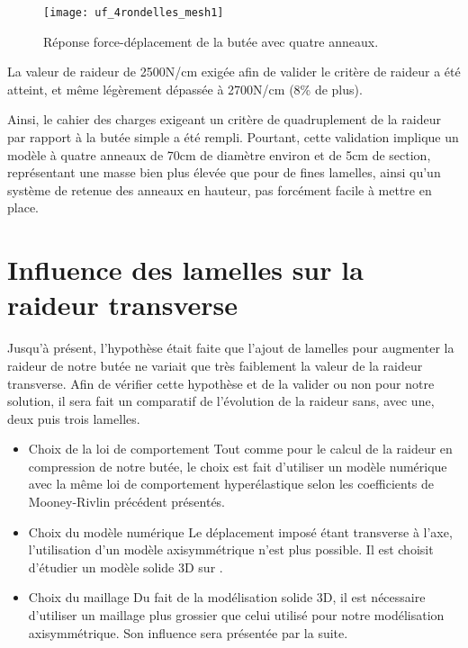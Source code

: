 ﻿\documentclass{article}
\newcommand{\abaqus}{\bsc{Abaqus}\xspace}
\newcommand{\cimg}{0.8}
\begin{document}
\begin{figure}[!h]
	\centering
	\texttt{[image: uf\_4rondelles\_mesh1]}
	\caption{Réponse force-déplacement de la butée avec quatre anneaux.}
	\label{fig36}
\end{figure}

La valeur de raideur de 2500N/cm exigée afin de valider le critère de raideur a été atteint, et même légèrement dépassée à 2700N/cm (8\% de plus).

Ainsi, le cahier des charges exigeant un critère de quadruplement de la raideur par rapport à la butée simple a été rempli. Pourtant, cette validation implique un modèle à quatre anneaux de 70cm de diamètre environ et de 5cm de section, représentant une masse bien plus élevée que pour de fines lamelles, ainsi qu'un système de retenue des anneaux en hauteur, pas forcément facile à mettre en place.

\section{Influence des lamelles sur la raideur transverse}
Jusqu'à présent, l'hypothèse était faite que l'ajout de lamelles pour augmenter la raideur de notre butée ne variait que très faiblement la valeur de la raideur transverse. Afin de vérifier cette hypothèse et de la valider ou non pour notre solution, il sera fait un comparatif de l'évolution de la raideur sans, avec une, deux puis trois lamelles. 

\begin{itemize}
\item Choix de la loi de comportement
Tout comme pour le calcul de la raideur en compression de notre butée, le choix est fait d'utiliser un modèle numérique avec la même loi de comportement hyperélastique selon les coefficients de Mooney-Rivlin précédent présentés.
\item Choix du modèle numérique
Le déplacement imposé étant transverse à l'axe, l'utilisation d'un modèle axisymmétrique n'est plus possible. Il est choisit d'étudier un modèle solide 3D sur \abaqus.
\item Choix du maillage
Du fait de la modélisation solide 3D, il est nécessaire d'utiliser un maillage plus grossier que celui utilisé pour notre modélisation axisymmétrique. Son influence sera présentée par la suite. 
\end{itemize}
\end{document}
